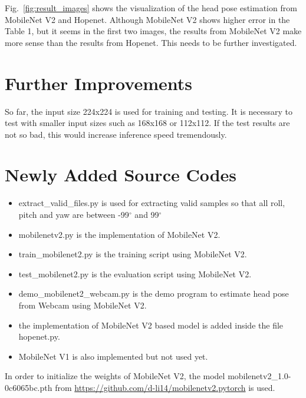 \documentclass[letterpaper, 10 pt, conference]{ieeeconf}  %
\begin{document}
Fig.~\ref{fig:result_images} shows the visualization of the head pose estimation from MobileNet V2 and Hopenet. Although MobileNet V2 shows higher error in the Table 1, but
it seems in the first two images, the results from MobileNet V2 make more sense than the results from Hopenet. This needs to be further investigated.

\section{Further Improvements}

So far, the input size 224x224 is used for training and testing. It is necessary to test with smaller input sizes such as 168x168 or 112x112.
If the test results are not so bad, this would increase inference speed tremendously.

\section{Newly Added Source Codes}
\begin{itemize}
	\item extract\_valid\_files.py is used for extracting valid samples so that all roll, pitch and yaw are between -99$^\circ$ and 99$^\circ$
	\item mobilenetv2.py is the implementation of MobileNet V2.
	\item train\_mobilenet2.py is the training script using MobileNet V2.
	\item test\_mobilenet2.py is the evaluation script using MobileNet V2.
	\item demo\_mobilenet2\_webcam.py is the demo program to estimate head pose from Webcam using MobileNet V2.
	\item the implementation of MobileNet V2 based model is added inside the file hopenet.py.
	\item MobileNet V1 is also implemented but not used yet.
\end{itemize}

In order to initialize the weights of MobileNet V2, the model mobilenetv2\_1.0-0c6065bc.pth from \url{https://github.com/d-li14/mobilenetv2.pytorch} is used.

{\small
	
	
}
\end{document}
